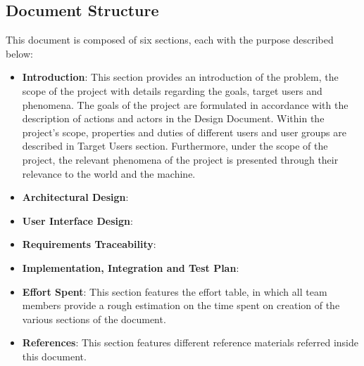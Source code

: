 \subsection{Document Structure}
This document is composed of six sections, each with the purpose described below: \\
\begin{itemize}
    \item \textbf{Introduction}: This section provides an introduction of the problem, the scope of the project with details regarding the goals, target users and phenomena.
        The goals of the project are formulated in accordance with the description of actions and actors in the Design Document.
        Within the project's scope, properties and duties of different users and user groups are described in Target Users section.
        Furthermore, under the scope of the project, the relevant phenomena of the project is presented through their relevance to the world and the machine.
    \item \textbf{Architectural Design}:
    \item \textbf{User Interface Design}:

    \item \textbf{Requirements Traceability}:
    \item \textbf{Implementation, Integration and Test Plan}:
    \item \textbf{Effort Spent}: This section features the effort table, in which all team members provide a rough estimation on the time spent on creation of the various sections of the document.
    \item \textbf{References}: This section features different reference materials referred inside this document.
\end{itemize}
